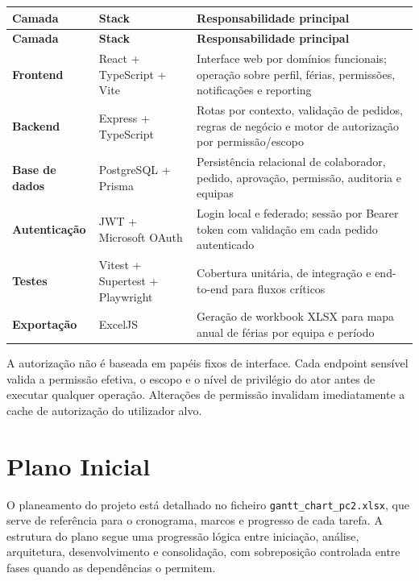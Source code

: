 \documentclass[11pt,a4paper,twoside]{article}
\newcommand{\tH}[1]{\textbf{\sffamily\small\color{white}#1}}
\newcommand{\theadrow}{\rowcolor{ACCENT}}
\begin{document}
\begin{longtable}{>{\small\bfseries}p{3.0cm} >{\small\centering\arraybackslash}p{3.2cm} >{\small}p{7.0cm}}
\theadrow
\tH{Camada} & \tH{Stack} & \tH{Responsabilidade principal} \\
\midrule
\endfirsthead
\theadrow
\tH{Camada} & \tH{Stack} & \tH{Responsabilidade principal} \\
\midrule
\endhead
Frontend & React + TypeScript + Vite & Interface web por domínios funcionais; operação sobre perfil, férias, permissões, notificações e reporting \\
Backend & Express + TypeScript & Rotas por contexto, validação de pedidos, regras de negócio e motor de autorização por permissão/escopo \\
Base de dados & PostgreSQL + Prisma & Persistência relacional de colaborador, pedido, aprovação, permissão, auditoria e equipas \\
Autenticação & JWT + Microsoft OAuth & Login local e federado; sessão por Bearer token com validação em cada pedido autenticado \\
Testes & Vitest + Supertest + Playwright & Cobertura unitária, de integração e end-to-end para fluxos críticos \\
Exportação & ExcelJS & Geração de workbook XLSX para mapa anual de férias por equipa e período \\
\bottomrule
\end{longtable}

\begin{note}
A autorização não é baseada em papéis fixos de interface. Cada endpoint sensível valida a permissão efetiva, o escopo e o nível de privilégio do ator antes de executar qualquer operação. Alterações de permissão invalidam imediatamente a cache de autorização do utilizador alvo.
\end{note}

\section{Plano Inicial}

O planeamento do projeto está detalhado no ficheiro \texttt{gantt\_chart\_pc2.xlsx}, que serve de referência para o cronograma, marcos e progresso de cada tarefa. A estrutura do plano segue uma progressão lógica entre iniciação, análise, arquitetura, desenvolvimento e consolidação, com sobreposição controlada entre fases quando as dependências o permitem.
\end{document}
